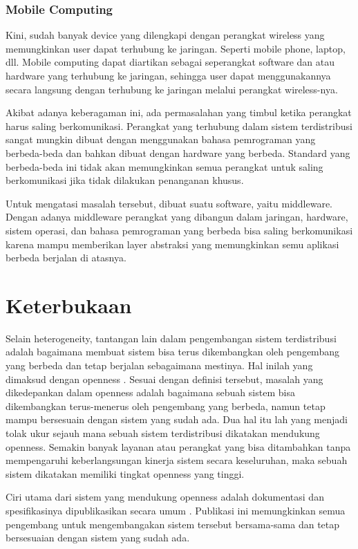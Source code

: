 \documentclass[12pt,a4paper]{apa}
\begin{document}
	\subsubsection{Mobile Computing}
		
		Kini, sudah banyak device yang dilengkapi dengan perangkat wireless yang memungkinkan user dapat terhubung ke jaringan. Seperti mobile phone, laptop, dll. Mobile computing dapat diartikan sebagai seperangkat software dan atau hardware yang terhubung ke jaringan, sehingga user dapat menggunakannya secara langsung dengan terhubung ke jaringan melalui perangkat wireless-nya.
		
		Akibat adanya keberagaman ini, ada permasalahan yang timbul ketika perangkat harus saling berkomunikasi. Perangkat yang terhubung dalam sistem terdistribusi sangat mungkin dibuat dengan menggunakan bahasa pemrograman yang berbeda-beda dan bahkan dibuat dengan hardware yang berbeda. Standard yang berbeda-beda ini tidak akan memungkinkan semua perangkat untuk saling berkomunikasi jika tidak dilakukan penanganan khusus.
		
		Untuk mengatasi masalah tersebut, dibuat suatu software, yaitu middleware. Dengan adanya middleware perangkat yang dibangun dalam jaringan, hardware, sistem operasi, dan bahasa pemrograman yang berbeda bisa saling berkomunikasi karena mampu memberikan layer abstraksi yang memungkinkan semu aplikasi berbeda berjalan di atasnya. \cite{Coulouris2012}
	\section{Keterbukaan}
	Selain heterogeneity, tantangan lain dalam pengembangan sistem terdistribusi adalah bagaimana membuat sistem bisa terus dikembangkan oleh pengembang yang berbeda dan tetap berjalan sebagaimana mestinya. Hal inilah yang dimaksud dengan openness \cite{Coulouris2012}. Sesuai dengan definisi tersebut, masalah yang dikedepankan dalam openness adalah bagaimana sebuah sistem bisa dikembangkan terus-menerus oleh pengembang yang berbeda, namun tetap mampu bersesuain dengan sistem yang sudah ada. Dua hal itu lah yang menjadi tolak ukur sejauh mana sebuah sistem terdistribusi dikatakan mendukung openness. Semakin banyak layanan atau perangkat yang bisa ditambahkan tanpa mempengaruhi keberlangsungan kinerja sistem secara keseluruhan, maka sebuah sistem dikatakan memiliki tingkat openness yang tinggi. \cite{Coulouris2012}
	
	Ciri utama dari sistem yang mendukung openness adalah dokumentasi dan spesifikasinya dipublikasikan secara umum \cite{Kamalapur2008}. Publikasi ini memungkinkan semua pengembang untuk  mengembangakan sistem tersebut bersama-sama dan tetap bersesuaian dengan sistem yang sudah ada.
	
\end{document}
